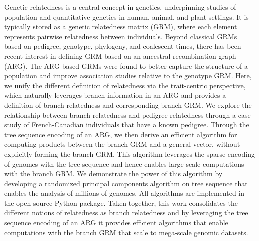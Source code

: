 Genetic relatedness is a central concept in genetics,
underpinning studies of population and quantitative genetics in human, animal, and plant settings.
%
It is typically stored as a genetic relatedness matrix (GRM),
where each element represents pairwise relatedness between individuals.
%
Beyond classical GRMs based on pedigree, genotype, phylogeny, and coalescent times,
there has been recent interest in defining GRM based on an ancestral recombination graph (ARG).
%
The ARG-based GRMs were found to better capture the structure of a population and
improve association studies relative to the genotype GRM.
%
Here, we unify the different definition of relatedness via the trait-centric perspective, which naturally leverages branch information in an ARG and provides a definition of branch relatedness and corresponding branch GRM.
%
We explore the relationship between branch relatedness and pedigree relatedness through a case study of French-Canadian individuals that have a known pedigree.
%
Through the tree sequence encoding of an ARG, we then derive an efficient algorithm for computing products between the branch GRM and a general vector, without explicitly forming the branch GRM.
%
This algorithm leverages the sparse encoding of genomes with the tree sequence and hence enables large-scale computations with the branch GRM.
%
We demonstrate the power of this algorithm by developing
a randomized principal components algorithm on tree sequence
that enables the analysis of millions of genomes.
%
All algorithms are implemented in the open source \tskit{} Python package.
%
Taken together, this work consolidates the different notions of relatedness as branch relatedness
and by leveraging the tree sequence encoding of an ARG it provides efficient algorithms
that enable computations with the branch GRM that scale to mega-scale genomic datasets.
